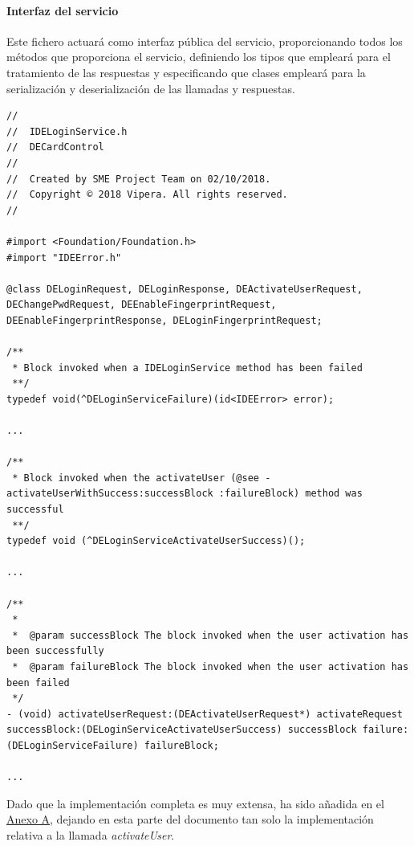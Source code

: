 \documentclass[a4paper, 12pt]{article}
\newenvironment{code}{\captionsetup{type=listing}}{}
\begin{document}
\paragraph{Interfaz del servicio}
\label{sec-4-2-3-1}
Este fichero actuará como interfaz pública del servicio, proporcionando todos los métodos que proporciona el servicio, definiendo los tipos que empleará para el tratamiento de las respuestas y
especificando que clases empleará para la serialización y deserialización de las llamadas y respuestas.
\begin{code}
\label{code:ios-interface-partial}
\begin{verbatim}
//
//  IDELoginService.h
//  DECardControl
//
//  Created by SME Project Team on 02/10/2018.
//  Copyright © 2018 Vipera. All rights reserved.
//

#import <Foundation/Foundation.h>
#import "IDEError.h"

@class DELoginRequest, DELoginResponse, DEActivateUserRequest, DEChangePwdRequest, DEEnableFingerprintRequest, DEEnableFingerprintResponse, DELoginFingerprintRequest;

/**
 * Block invoked when a IDELoginService method has been failed
 **/
typedef void(^DELoginServiceFailure)(id<IDEError> error);

...

/**
 * Block invoked when the activateUser (@see -activateUserWithSuccess:successBlock :failureBlock) method was successful
 **/
typedef void (^DELoginServiceActivateUserSuccess)();

...

/**
 *
 *  @param successBlock The block invoked when the user activation has been successfully
 *  @param failureBlock The block invoked when the user activation has been failed
 */
- (void) activateUserRequest:(DEActivateUserRequest*) activateRequest successBlock:(DELoginServiceActivateUserSuccess) successBlock failure:(DELoginServiceFailure) failureBlock;

...

\end{verbatim}
\end{code}
\bigbreak
Dado que la implementación completa es muy extensa, ha sido añadida en el \hyperref[code:ios-interface]{Anexo A}, dejando en esta parte del documento tan solo la implementación relativa a la llamada
\emph{activateUser}.
\end{document}
